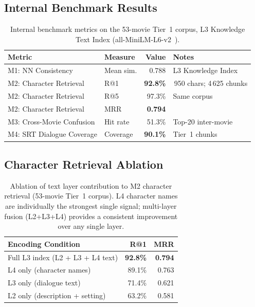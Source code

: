 \documentclass[11pt]{article}
\begin{document}
\subsection{Internal Benchmark Results}

\begin{table}[!htb]
\centering
\begin{tabular}{%
  >{\raggedright\arraybackslash}p{5.2cm}
  >{\raggedright\arraybackslash}p{2.0cm} r
  >{\raggedright\arraybackslash}p{3.6cm}}
\toprule
\textbf{Metric} & \textbf{Measure} & \textbf{Value} & \textbf{Notes} \\
\midrule
M1: NN Consistency       & Mean sim.  & 0.788             & L3 Knowledge Index \\
M2: Character Retrieval  & R@1        & \textbf{92.8\%}  & 1\,950 chars; 4\,625 chunks \\
M2: Character Retrieval  & R@5        & 97.3\%            & Same corpus \\
M2: Character Retrieval  & MRR        & \textbf{0.794}   & \\
M3: Cross-Movie Confusion & Hit rate  & 51.3\%            & Top-20 inter-movie \\
M4: SRT Dialogue Coverage & Coverage  & \textbf{90.1\%}  & Tier~1 chunks \\
\bottomrule
\end{tabular}
\caption{Internal benchmark metrics on the 53-movie Tier~1 corpus, L3
Knowledge Text Index (all-MiniLM-L6-v2~\cite{sbert}).}
\label{tab:results}
\end{table}

\subsection{Character Retrieval Ablation}

\begin{table}[!htb]
\centering
\begin{tabular}{>{\raggedright\arraybackslash}p{6.0cm} r r}
\toprule
\textbf{Encoding Condition} & \textbf{R@1} & \textbf{MRR} \\
\midrule
Full L3 index (L2 + L3 + L4 text) & \textbf{92.8\%} & \textbf{0.794} \\
L4 only (character names)          & 89.1\%           & 0.763 \\
L3 only (dialogue text)            & 71.4\%           & 0.621 \\
L2 only (description + setting)    & 63.2\%           & 0.581 \\
\bottomrule
\end{tabular}
\caption{Ablation of text layer contribution to M2 character retrieval
(53-movie Tier~1 corpus).  L4 character names are individually the strongest
single signal; multi-layer fusion (L2+L3+L4) provides a consistent
improvement over any single layer.}
\label{tab:ablation}
\end{table}
\end{document}
